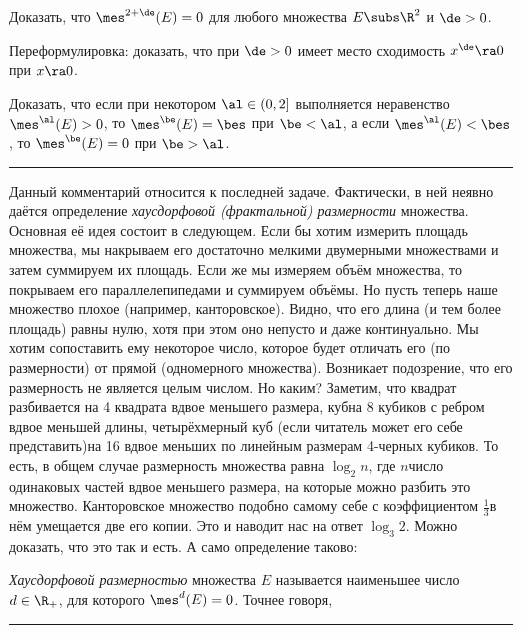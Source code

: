 \documentclass[a4paper]{article}
\newenvironment{petit}
{\par \smallskip \hrule \smallskip \footnotesize}
{\par \smallskip \hrule \smallskip}
\begin{document}
\begin{problem}
Доказать, что $\mes^{2+\de}(E)=0$ для любого множества $E\subs\R^2$ и $\de > 0$.
\end{problem}
\begin{hint}
Переформулировка: доказать, что при $\de>0$ имеет место сходимость $x^\de \ra 0$ при $x\ra 0$.
\end{hint}

\begin{problem}
Доказать, что если при некотором $\al \in (0,2]$ выполняется неравенство $\mes^\al(E)>0$, то $\mes^\be(E)=\bes$
при $\be < \al$, а  если $\mes^\al(E)<\bes$, то $\mes^\be(E)=0$ при $\be > \al$.
\end{problem}

\begin{petit}
Данный комментарий относится к последней задаче. Фактически, в ней неявно даётся определение \emph{хаусдорфовой
(фрактальной) размерности} множества. Основная её идея состоит в следующем. Если бы хотим измерить площадь множества,
мы накрываем его достаточно мелкими двумерными множествами и затем суммируем их площадь. Если же мы измеряем объём
множества, то покрываем его параллелепипедами и суммируем объёмы. Но пусть теперь наше множество плохое (например,
канторовское). Видно, что его длина (и тем более площадь) равны нулю, хотя при этом оно непусто и даже континуально.
Мы хотим сопоставить ему некоторое число, которое будет отличать его (по размерности) от прямой (одномерного множества).
Возникает подозрение, что его размерность не является целым числом. Но каким? Заметим, что квадрат разбивается на
4 квадрата вдвое меньшего размера, куб\т на 8 кубиков с ребром вдвое меньшей длины, четырёхмерный
куб (если читатель может его себе представить)\т на 16 вдвое меньших по линейным размерам 4-черных кубиков.
То есть, в общем случае размерность множества равна $\log_2 n$, где $n$\т число одинаковых частей вдвое
меньшего размера, на которые можно разбить это множество. Канторовское множество подобно самому себе с
коэффициентом $\frac13$\т в нём умещается две его копии. Это и наводит нас на ответ $\log_3 2$. Можно доказать, что
это так и есть. А само определение таково:

\begin{df}
\emph{Хаусдорфовой размерностью} множества $E$ называется наименьшее число $d \in \R_+$,
для которого $\mes^d(E)=0$. Точнее говоря,
\end{df}
\end{petit}
\end{document}
